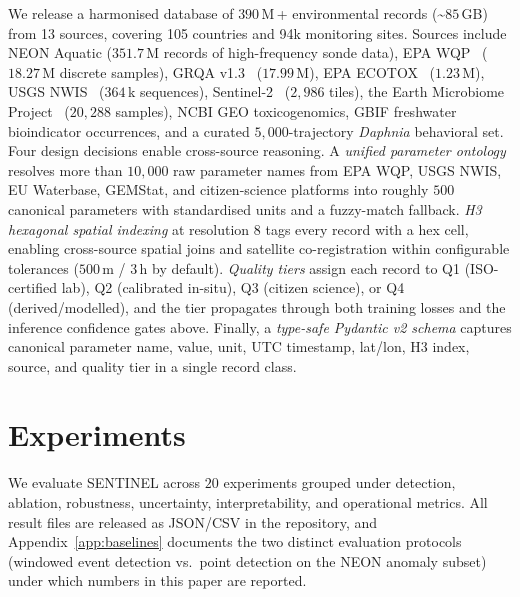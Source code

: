 \documentclass{article}
\begin{document}
We release a harmonised database of $390$\,M\,+ environmental records (\textasciitilde$85$\,GB) from 13 sources, covering 105 countries and 94k monitoring sites. Sources include NEON Aquatic ($351.7$\,M records of high-frequency sonde data), EPA WQP~\citep{epa_wqp} ($18.27$\,M discrete samples), GRQA v1.3~\citep{virro2021grqa} ($17.99$\,M), EPA ECOTOX~\citep{epa_ecotox} ($1.23$\,M), USGS NWIS~\citep{usgs_nwis} ($364$\,k sequences), Sentinel-2~\citep{drusch2012sentinel2} ($2{,}986$ tiles), the Earth Microbiome Project~\citep{thompson2017earthmicrobiome} ($20{,}288$ samples), NCBI GEO toxicogenomics, GBIF freshwater bioindicator occurrences, and a curated $5{,}000$-trajectory \emph{Daphnia} behavioral set. Four design decisions enable cross-source reasoning. A \emph{unified parameter ontology} resolves more than $10{,}000$ raw parameter names from EPA WQP, USGS NWIS, EU Waterbase, GEMStat, and citizen-science platforms into roughly $500$ canonical parameters with standardised units and a fuzzy-match fallback. \emph{H3 hexagonal spatial indexing} at resolution $8$ tags every record with a hex cell, enabling cross-source spatial joins and satellite co-registration within configurable tolerances ($500$\,m / $3$\,h by default). \emph{Quality tiers} assign each record to Q1 (ISO-certified lab), Q2 (calibrated in-situ), Q3 (citizen science), or Q4 (derived/modelled), and the tier propagates through both training losses and the inference confidence gates above. Finally, a \emph{type-safe Pydantic v2 schema} captures canonical parameter name, value, unit, UTC timestamp, lat/lon, H3 index, source, and quality tier in a single record class.

\section{Experiments}
\label{sec:exp}

We evaluate SENTINEL across $20$ experiments grouped under detection, ablation, robustness, uncertainty, interpretability, and operational metrics. All result files are released as JSON/CSV in the repository, and Appendix~\ref{app:baselines} documents the two distinct evaluation protocols (windowed event detection vs.\ point detection on the NEON anomaly subset) under which numbers in this paper are reported.
\end{document}

